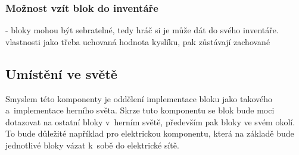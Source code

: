\subsubsection{Možnost vzít blok do inventáře}

- bloky mohou být sebratelné, tedy hráč si je může dát do svého inventáře. vlastnosti jako třeba uchovaná hodnota kyslíku, pak zůstávají zachované

\subsection{Umístění ve světě}

Smyslem této komponenty je oddělení implementace bloku jako takového a~implementace herního světa. Skrze tuto komponentu se blok bude moci dotazovat na ostatní bloky v~herním světě, především pak bloky ve svém okolí. To bude důležité například pro elektrickou komponentu, která na základě  bude jednotlivé bloky vázat k~sobě do elektrické sítě.






